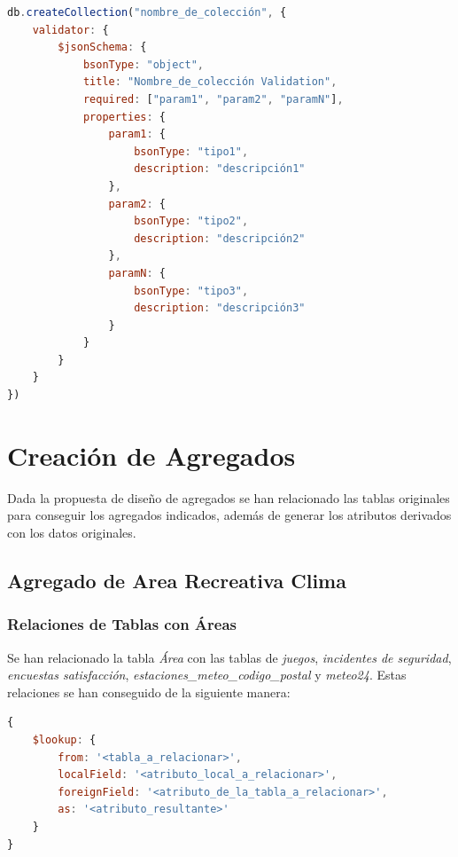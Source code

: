 \documentclass[]{article}
\begin{document}
\begin{lstlisting}[language=JavaScript, caption=Estructura genérica de la validación de esquemas]
db.createCollection("nombre_de_colección", {
    validator: {
        $jsonSchema: {
            bsonType: "object",
            title: "Nombre_de_colección Validation",
            required: ["param1", "param2", "paramN"],
            properties: {
                param1: {
                    bsonType: "tipo1",
                    description: "descripción1"
                },
                param2: {
                    bsonType: "tipo2",
                    description: "descripción2"
                },
                paramN: {
                    bsonType: "tipo3",
                    description: "descripción3"
                }
            }
        }
    }
})
\end{lstlisting}

\section{Creación de Agregados}
\label{sec:creacion_agregados}
Dada la propuesta de diseño de agregados se han relacionado las tablas originales para conseguir los agregados indicados, además de generar los atributos derivados con los datos originales.

\subsection{Agregado de Area Recreativa Clima}
\label{subsec:agregado_area}

\subsubsection{Relaciones de Tablas con Áreas}
\label{subsubsec:relaciones_area}

Se han relacionado la tabla \textit{Área} con las tablas de \textit{juegos}, \textit{incidentes de seguridad}, \textit{encuestas satisfacción}, \textit{estaciones\_meteo\_codigo\_postal} y \textit{meteo24}.
Estas relaciones se han conseguido de la siguiente manera:
\begin{lstlisting}[language=JavaScript, caption=Operadores para relacionar tablas en mongodb]
{
    $lookup: {
        from: '<tabla_a_relacionar>',
        localField: '<atributo_local_a_relacionar>',
        foreignField: '<atributo_de_la_tabla_a_relacionar>',
        as: '<atributo_resultante>'
    }
}
\end{lstlisting}
\end{document}
